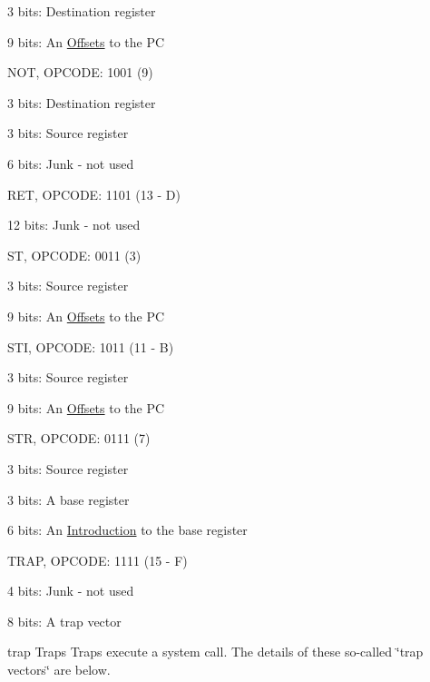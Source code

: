 \begin{DoxyItemize}
\begin{DoxyItemize}
\item 3 bits: Destination register 
\item 9 bits: An \hyperlink{index_offset}{Offsets} to the PC 
\end{DoxyItemize}\item NOT, OPCODE: 1001 (9) 
\begin{DoxyItemize}
\item 3 bits: Destination register 
\item 3 bits: Source register 
\item 6 bits: Junk -\/ not used 
\end{DoxyItemize}\item RET, OPCODE: 1101 (13 -\/ D) 
\begin{DoxyItemize}
\item 12 bits: Junk -\/ not used 
\end{DoxyItemize}\item ST, OPCODE: 0011 (3) 
\begin{DoxyItemize}
\item 3 bits: Source register 
\item 9 bits: An \hyperlink{index_offset}{Offsets} to the PC 
\end{DoxyItemize}\item STI, OPCODE: 1011 (11 -\/ B) 
\begin{DoxyItemize}
\item 3 bits: Source register 
\item 9 bits: An \hyperlink{index_offset}{Offsets} to the PC 
\begin{DoxyItemize}
\end{DoxyItemize}STR, OPCODE: 0111 (7) 
\begin{DoxyItemize}
\item 3 bits: Source register 
\item 3 bits: A base register 
\item 6 bits: An \hyperlink{index}{Introduction} to the base register 
\begin{DoxyItemize}
\end{DoxyItemize}TRAP, OPCODE: 1111 (15 -\/ F) 
\begin{DoxyItemize}
\item 4 bits: Junk -\/ not used 
\item 8 bits: A trap vector 
\begin{DoxyItemize}
\end{DoxyItemize}trap Traps Traps execute a system call. The details of these so-\/called \char`\"{}trap vectors\char`\"{} are below. 

\end{DoxyItemize}
\end{DoxyItemize}
\end{DoxyItemize}
\end{DoxyItemize}
